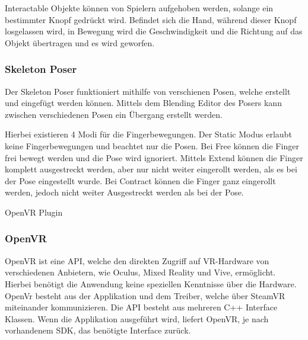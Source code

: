 Interactable Objekte können von Spielern aufgehoben werden, solange ein bestimmter Knopf gedrückt wird.
Befindet sich die Hand, während dieser Knopf losgelassen wird, in Bewegung wird die Geschwindigkeit und die Richtung auf das Objekt übertragen und es wird geworfen.
~\cite{SteamVR_Interaction_System_2022}

\subsubsection{Skeleton Poser}
Der Skeleton Poser funktioniert mithilfe von verschienen Posen, welche erstellt und eingefügt werden können.
Mittels dem Blending Editor des Posers kann zwischen verschiedenen Posen ein Übergang erstellt werden.

Hierbei existieren 4 Modi für die Fingerbewegungen.
Der Static Modus erlaubt keine Fingerbewegungen und beachtet nur die Posen.
Bei Free können die Finger frei bewegt werden und die Pose wird ignoriert.
Mittels Extend können die Finger komplett ausgestreckt werden, aber nur nicht weiter eingerollt werden, als es bei der Pose eingestellt wurde.
Bei Contract können die Finger ganz eingerollt werden, jedoch nicht weiter Ausgestreckt werden als bei der Pose.
~\cite{SteamVR_Skeleton_Poser_2022}

OpenVR Plugin
\subsubsection{OpenVR}
OpenVR ist eine API, welche den direkten Zugriff auf VR-Hardware von verschiedenen Anbietern, wie Oculus, Mixed Reality und Vive, ermöglicht.
Hierbei benötigt die Anwendung keine speziellen Kenntnisse über die Hardware.
OpenVr besteht aus der Applikation und dem Treiber, welche über SteamVR miteinander kommunizieren.
Die API besteht aus mehreren C++ Interface Klassen.
Wenn die Applikation ausgeführt wird, liefert OpenVR, je nach vorhandenem SDK, das benötigte Interface zurück.
~\cite{OpenVR_Github_Documentation_2020}

